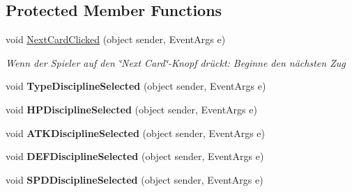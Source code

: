 \subsection*{Protected Member Functions}
\begin{DoxyCompactItemize}
\item 
void \mbox{\hyperlink{class_main_window_a148f7bce0a5842ae629b21de2516e585}{Next\+Card\+Clicked}} (object sender, Event\+Args e)
\begin{DoxyCompactList}\small\item\em Wenn der Spieler auf den \char`\"{}\+Next Card\char`\"{}-\/\+Knopf drückt\+: Beginne den nächsten Zug \end{DoxyCompactList}\item 
\mbox{\label{class_main_window_ad015c2c419d25830d71dcaac0f97b199}} 
void {\bfseries Type\+Discipline\+Selected} (object sender, Event\+Args e)
\item 
\mbox{\label{class_main_window_a4adf98b53f1040dab240bcb004c88342}} 
void {\bfseries H\+P\+Discipline\+Selected} (object sender, Event\+Args e)
\item 
\mbox{\label{class_main_window_a1d3d2bb960da9925ef3c85b3f5fbef42}} 
void {\bfseries A\+T\+K\+Discipline\+Selected} (object sender, Event\+Args e)
\item 
\mbox{\label{class_main_window_add34c6d17740a7e065c6d1bededaf145}} 
void {\bfseries D\+E\+F\+Discipline\+Selected} (object sender, Event\+Args e)
\item 
\mbox{\label{class_main_window_af0fbe61daf0feaf38240ffca739f4a88}} 
void {\bfseries S\+P\+D\+Discipline\+Selected} (object sender, Event\+Args e)
\end{DoxyCompactItemize}
